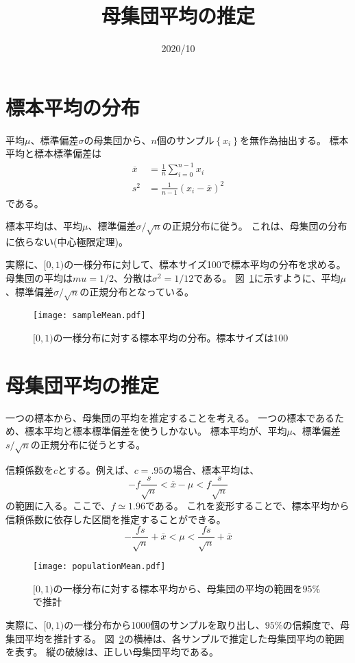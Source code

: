 \documentclass[a4j,12pt]{ltjarticle}
\title{母集団平均の推定}
\author{}
\date{2020/10}
\begin{document}
\maketitle
\section{標本平均の分布}
平均$\mu$、標準偏差$\sigma$の母集団から、$n$個のサンプル$\left\lbrace x_i\right\rbrace$を無作為抽出する。
標本平均と標本標準偏差は
\begin{align}
    \overline{x}&=\frac{1}{n}\sum_{i=0}^{n-1}x_i\\
    s^2&=\frac{1}{n-1}\left(x_i-\overline{x}\right)^2
\end{align}
である。

標本平均は、平均$\mu$、標準偏差$\sigma/\sqrt{n}$の正規分布に従う。
これは、母集団の分布に依らない(中心極限定理)。

実際に、$[0,1)$の一様分布に対して、標本サイズ100で標本平均の分布を求める。
母集団の平均は$mu=1/2$、分散は$\sigma^2=1/12$である。
図~\ref{normal}に示すように、平均$\mu$、標準偏差$\sigma/\sqrt{n}$の正規分布となっている。
\begin{figure}[ht]
    \centering
    \texttt{[image: sampleMean.pdf]}
    \caption{$[0,1)$の一様分布に対する標本平均の分布。標本サイズは100}
    \label{normal}
\end{figure}

\section{母集団平均の推定}
一つの標本から、母集団の平均を推定することを考える。
一つの標本であるため、標本平均と標本標準偏差を使うしかない。
標本平均が、平均$\mu$、標準偏差$s/\sqrt{n}$の正規分布に従うとする。

信頼係数を$c$とする。例えば、$c=.95$の場合、標本平均は、
\begin{equation}
-f\frac{s}{\sqrt{n}}<\overline{x}-\mu<f\frac{s}{\sqrt{n}}
\end{equation}
の範囲に入る。ここで、$f\simeq1.96$である。
これを変形することで、標本平均から信頼係数に依存した区間を推定することができる。
\begin{equation}
    -\frac{fs}{\sqrt{n}}+\overline{x}<\mu<\frac{fs}{\sqrt{n}}+\overline{x}
\end{equation}

\begin{figure}[ht]
    \centering
    \texttt{[image: populationMean.pdf]}
    \caption{$[0,1)$の一様分布に対する標本平均から、母集団の平均の範囲を$95\%$で推計}
    \label{populationMean}
\end{figure}

実際に、$[0,1)$の一様分布から1000個のサンプルを取り出し、$95\%$の信頼度で、母集団平均を推計する。
図~\ref{populationMean}の横棒は、各サンプルで推定した母集団平均の範囲を表す。
縦の破線は、正しい母集団平均である。
\end{document}

